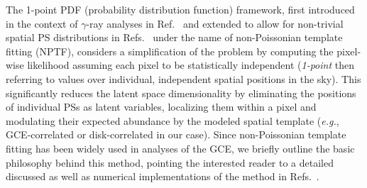 \documentclass[prd,aps,10pt,nofootinbib,twocolumn,superscriptaddress,preprintnumbers,balancelastpage,longbibliography]{revtex4-1}
\begin{document}
The 1-point PDF (probability distribution function) framework, first introduced in the context of $\gamma$-ray analyses in Ref.~\cite{Malyshev:2011zi} and extended to allow for non-trivial spatial PS distributions in Refs.~\cite{Lee:2014mza,Lee:2015fea} under the name of non-Poissonian template fitting (NPTF), considers a simplification of the problem by computing the pixel-wise likelihood assuming each pixel to be statistically independent (\emph{1-point} then referring to values over individual, independent spatial positions in the sky). This significantly reduces the latent space dimensionality by eliminating the positions of individual PSs as latent variables, localizing them within a pixel and modulating their expected abundance by the modeled spatial template (\emph{e.g.}, GCE-correlated or disk-correlated in our case). Since non-Poissonian template fitting has been widely used in analyses of the GCE, we briefly outline the basic philosophy behind this method, pointing the interested reader to a detailed discussed as well as numerical implementations of the method in Refs.~\cite{Lee:2015fea,Mishra-Sharma:2016gis}.
\end{document}
